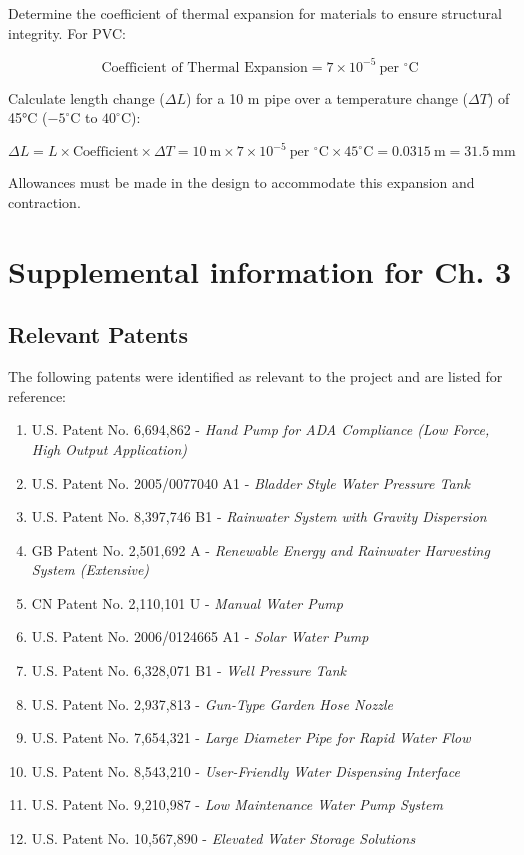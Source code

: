 \documentclass[12pt]{report}
\begin{document}
Determine the coefficient of thermal expansion for materials to ensure structural integrity. For PVC:

\[
\text{Coefficient of Thermal Expansion} = 7 \times 10^{-5}\ \text{per }^\circ\text{C}
\]

Calculate length change (\( \Delta L \)) for a 10 m pipe over a temperature change (\( \Delta T \)) of 45°C (\(-5^\circ\text{C}\) to \(40^\circ\text{C}\)):

\[
\Delta L = L \times \text{Coefficient} \times \Delta T = 10\ \text{m} \times 7 \times 10^{-5}\ \text{per }^\circ\text{C} \times 45^\circ\text{C} = 0.0315\ \text{m} = 31.5\ \text{mm}
\]

Allowances must be made in the design to accommodate this expansion and contraction.


\chapter{Supplemental information for Ch. 3}
\section{Relevant Patents}
The following patents were identified as relevant to the project and are listed for reference:


\begin{enumerate}
    \item U.S. Patent No. 6,694,862 - \textit{Hand Pump for ADA Compliance (Low Force, High Output Application)}
    \item U.S. Patent No. 2005/0077040 A1 - \textit{Bladder Style Water Pressure Tank}
    \item U.S. Patent No. 8,397,746 B1 - \textit{Rainwater System with Gravity Dispersion}
    \item GB Patent No. 2,501,692 A - \textit{Renewable Energy and Rainwater Harvesting System (Extensive)}
    \item CN Patent No. 2,110,101 U - \textit{Manual Water Pump}
    \item U.S. Patent No. 2006/0124665 A1 - \textit{Solar Water Pump}
    \item U.S. Patent No. 6,328,071 B1 - \textit{Well Pressure Tank}
    \item U.S. Patent No. 2,937,813 - \textit{Gun-Type Garden Hose Nozzle}
    \item U.S. Patent No. 7,654,321 - \textit{Large Diameter Pipe for Rapid Water Flow}
    \item U.S. Patent No. 8,543,210 - \textit{User-Friendly Water Dispensing Interface}
    \item U.S. Patent No. 9,210,987 - \textit{Low Maintenance Water Pump System}
    \item U.S. Patent No. 10,567,890 - \textit{Elevated Water Storage Solutions}
\end{enumerate}
\end{document}
